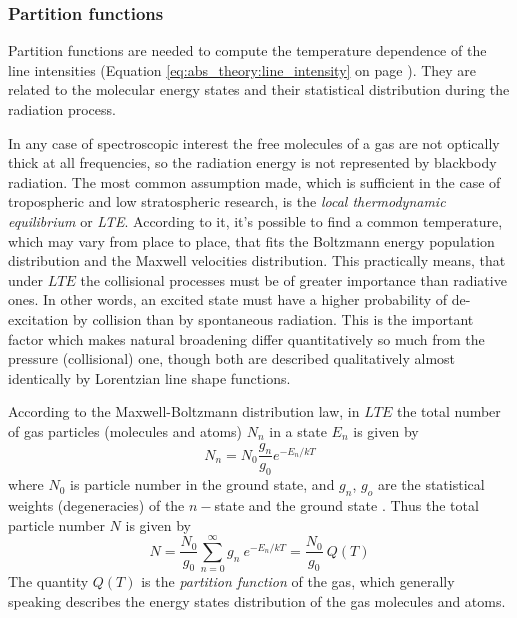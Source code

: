 \subsubsection{Partition functions}

Partition functions are needed to compute the temperature dependence
of the line intensities (Equation \ref{eq:abs_theory:line_intensity} on
page \pageref{eq:abs_theory:line_intensity}).  They are related to the
molecular energy states and their statistical distribution during the
radiation process.

In any case of spectroscopic interest the free molecules of a gas are
not optically thick at all frequencies, so the radiation energy is not
represented by blackbody radiation. The most common assumption made,
which is sufficient in the case of tropospheric and low stratospheric
research, is the {\textit{local thermodynamic equilibrium}\nocorr} or
{\textit{LTE}\nocorr}. According to it, it's possible to find a common temperature,
which may vary from place to place, that fits the Boltzmann energy
population distribution and the Maxwell velocities distribution.
This practically means, that under $LTE$ the collisional processes
must be of greater importance than radiative ones. In other words,
an excited state must have a higher probability of de-excitation by
collision than by spontaneous radiation. This is the important
factor which makes natural broadening differ quantitatively so much
from the pressure (collisional) one, though both are described
qualitatively almost identically by Lorentzian line shape
functions.

According to the Maxwell-Boltzmann distribution law, in $LTE$ the total number
of gas particles (molecules and atoms) $N_n$  in a state $E_n$ is given by 
\begin{equation}\label{eq:abs_theory:maxwell_distribution2}
 N_n=N_0\frac{g_n}{g_0}e^{-E_n/kT}
\end{equation}
where $N_0$ is particle number in the ground state, and $g_n$, $g_o$
are the statistical weights (degeneracies) of the $n-$state and the
ground state \citep{gordyandcook:70}. Thus the total particle number $N$ is given by
\begin{equation}\label{eq:abs_theory:total_part_number}
 N=\frac{N_0}{g_0}\sum_{n=0}^\infty g_n~e^{-E_n/kT}=\frac{N_0}{g_0}~Q(T)
\end{equation}
The quantity $Q(T)$ is the {\it{partition function}\nocorr} of the
gas, which generally speaking describes the energy states distribution
of the gas molecules and atoms. 

